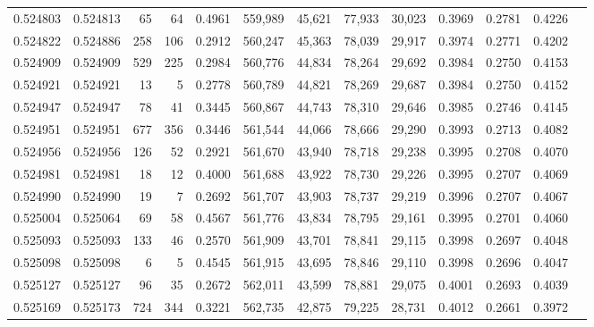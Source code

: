 \begin{tabular}{rrrrrrrrrrrrr}
0.524803 & 0.524813 &    65 &    64 &                                     0.4961 & 559,989 &  45,621 &  77,933 &  30,023 & 0.3969 & 0.2781 & 0.4226 \\
0.524822 & 0.524886 &   258 &   106 &                                     0.2912 & 560,247 &  45,363 &  78,039 &  29,917 & 0.3974 & 0.2771 & 0.4202 \\
0.524909 & 0.524909 &   529 &   225 &                                     0.2984 & 560,776 &  44,834 &  78,264 &  29,692 & 0.3984 & 0.2750 & 0.4153 \\
0.524921 & 0.524921 &    13 &     5 &                                     0.2778 & 560,789 &  44,821 &  78,269 &  29,687 & 0.3984 & 0.2750 & 0.4152 \\
0.524947 & 0.524947 &    78 &    41 &                                     0.3445 & 560,867 &  44,743 &  78,310 &  29,646 & 0.3985 & 0.2746 & 0.4145 \\
0.524951 & 0.524951 &   677 &   356 &                                     0.3446 & 561,544 &  44,066 &  78,666 &  29,290 & 0.3993 & 0.2713 & 0.4082 \\
0.524956 & 0.524956 &   126 &    52 &                                     0.2921 & 561,670 &  43,940 &  78,718 &  29,238 & 0.3995 & 0.2708 & 0.4070 \\
0.524981 & 0.524981 &    18 &    12 &                                     0.4000 & 561,688 &  43,922 &  78,730 &  29,226 & 0.3995 & 0.2707 & 0.4069 \\
0.524990 & 0.524990 &    19 &     7 &                                     0.2692 & 561,707 &  43,903 &  78,737 &  29,219 & 0.3996 & 0.2707 & 0.4067 \\
0.525004 & 0.525064 &    69 &    58 &                                     0.4567 & 561,776 &  43,834 &  78,795 &  29,161 & 0.3995 & 0.2701 & 0.4060 \\
0.525093 & 0.525093 &   133 &    46 &                                     0.2570 & 561,909 &  43,701 &  78,841 &  29,115 & 0.3998 & 0.2697 & 0.4048 \\
0.525098 & 0.525098 &     6 &     5 &                                     0.4545 & 561,915 &  43,695 &  78,846 &  29,110 & 0.3998 & 0.2696 & 0.4047 \\
0.525127 & 0.525127 &    96 &    35 &                                     0.2672 & 562,011 &  43,599 &  78,881 &  29,075 & 0.4001 & 0.2693 & 0.4039 \\
0.525169 & 0.525173 &   724 &   344 &                                     0.3221 & 562,735 &  42,875 &  79,225 &  28,731 & 0.4012 & 0.2661 & 0.3972 \\

\end{tabular}

